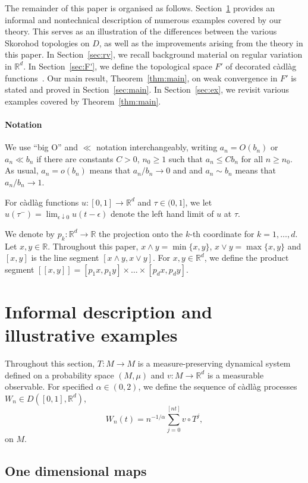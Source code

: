 \documentclass[12pt]{article}
\numberwithin{equation}{section}
\newcommand{\R}{{\mathbb R}}
\begin{document}
The remainder of this paper is organised as follows.
Section~\ref{sec:informal} provides an informal and nontechnical
description of numerous examples covered by our theory. This serves as an illustration of the differences between the various Skorohod topologies on $D$, as well as the improvements
arising from the theory in this paper.
In Section~\ref{sec:rv}, we recall background material on regular variation in $\R^d$.
In Section~\ref{sec:F'}, we define the topological space $F'$ of decorated c\`adl\`ag functions~\cite{Freitas2Toddsub}.
Our main result, Theorem~\ref{thm:main}, on weak convergence in $F'$ is stated and proved in Section~\ref{sec:main}.
In Section~\ref{sec:ex}, we revisit various examples covered by Theorem~\ref{thm:main}.


\paragraph{Notation}
We use ``big O'' and $\ll$ notation interchangeably, writing $a_n=O(b_n)$ or $a_n\ll b_n$
if there are constants $C>0$, $n_0\ge1$ such that
$a_n\le Cb_n$ for all $n\ge n_0$.
As usual, $a_n=o(b_n)$ means that $a_n/b_n\to0$ and
and $a_n\sim b_n$ means that $a_n/b_n\to1$.

For c\`adl\`ag functions $u:[0,1]\to\R^d$ and $\tau\in (0,1]$, we let
$u(\tau^-)=\lim_{\epsilon\downarrow 0} u(t-\epsilon)$ denote the left hand limit of $u$ at $\tau$.

We denote by $p_k:\R^d\to\R$ the projection onto the $k$-th coordinate for $k=1, \ldots, d$.
Let $x,y\in\R$.
Throughout this paper, $x\wedge y=\min\{x, y\}$, $x\vee y=\max\{x, y\}$
and $[x,y]$ is the line segment
$[x\wedge y,x\vee y]$. 
For $x,y\in\R^d$, we define the product segment
$[[x,y]]=[p_1x,p_1y]\times\dots\times[p_dx,p_dy]$.

\section{Informal description and illustrative examples}
\label{sec:informal}

Throughout this section,
$T:M\to M$ is a measure-preserving dynamical system defined on a probability space $(M,\mu)$ and $v:M\to\R^d$ is a measurable observable.
For specified $\alpha\in(0,2)$, we define the sequence of c\`adl\`ag processes $W_n\in D([0,1],\R^d)$,
\[
W_n(t)=n^{-1/\alpha}\sum_{j=0}^{[nt]}v\circ T^j,
\]
on $M$.

\subsection{One dimensional maps}
\end{document}
